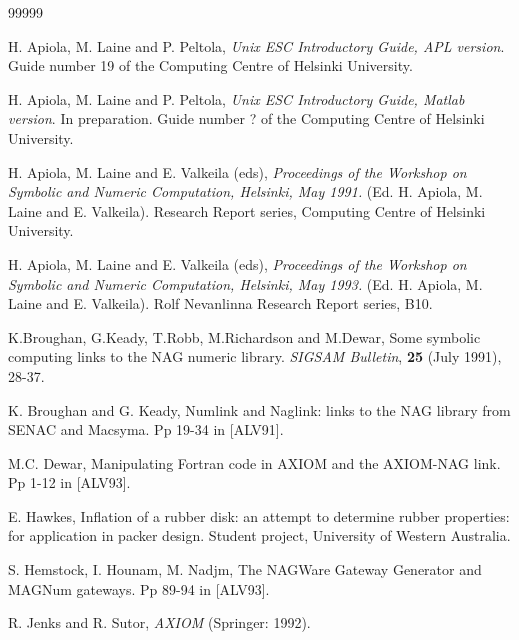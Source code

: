 \begin{thebibliography}{99999}

 H. Apiola, M. Laine and P. Peltola,
     {\it Unix ESC Introductory Guide,
      APL version}.
     Guide number 19 of the Computing Centre of Helsinki University.

 H. Apiola, M. Laine and P. Peltola,
     {\it Unix ESC Introductory Guide,
      Matlab version}.
      In preparation.
     Guide number ? of the Computing Centre of Helsinki University.

 H. Apiola, M. Laine and E. Valkeila (eds),
     {\it Proceedings of the
     Workshop on Symbolic and Numeric Computation,
     Helsinki, May 1991.} (Ed. H. Apiola, M. Laine and E. Valkeila).
     Research Report series, Computing Centre of Helsinki University.

 H. Apiola, M. Laine and E. Valkeila (eds),
     {\it Proceedings of the
     Workshop on Symbolic and Numeric Computation,
     Helsinki, May 1993.} (Ed. H. Apiola, M. Laine and E. Valkeila).
     Rolf Nevanlinna Research Report series, B10.

 K.Broughan, G.Keady, T.Robb, M.Richardson and
M.Dewar,
     Some symbolic computing links to the NAG numeric library.
     {\it SIGSAM Bulletin}, {\bf 25} (July 1991), 28-37.

 K. Broughan and G. Keady, Numlink and Naglink:
     links to the NAG library from SENAC and Macsyma.
     Pp 19-34 in [ALV91].

 M.C. Dewar,
     Manipulating Fortran code in AXIOM and the AXIOM-NAG link.
     Pp 1-12 in [ALV93].

E. Hawkes,
Inflation of a rubber disk:
an attempt to determine rubber properties: 
for application in packer design.
Student project, University of Western Australia.

S. Hemstock, I. Hounam, M. Nadjm,
The NAGWare Gateway Generator and MAGNum gateways.
Pp 89-94 in [ALV93].

R. Jenks and R. Sutor,
{\it AXIOM}
(Springer: 1992).


\end{thebibliography}
